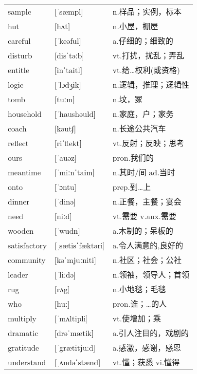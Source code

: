\documentclass[a4paper]{article}
\begin{document}
\section{}
\begin{tabular}{l l l}

sample & [ˈsæmpl] & n.样品；实例，标本 \\
hut & [hʌt] & n.小屋，棚屋 \\
careful & [ˈkeəful] & a.仔细的；细致的 \\
disturb & [disˈtəːb] & vt.打扰，扰乱；弄乱 \\
entitle & [inˈtaitl] & vt.给…权利(或资格) \\
logic & [ˈlɔdʒik] & n.逻辑，推理；逻辑性 \\
tomb & [tuːm] & n.坟，冢 \\
household & [ˈhaushəuld] & n.家庭，户；家务 \\
coach & [kəut∫] & n.长途公共汽车 \\
reflect & [riˈflekt] & vt.反射；反映；思考 \\
ours & [ˈauəz] & pron.我们的 \\
meantime & [ˈmiːnˈtaim] & n.其时/间 ad.当时 \\
onto & [ˈɔntu] & prep.到…上 \\
dinner & [ˈdinə] & n.正餐，主餐；宴会 \\
need & [niːd] & vt.需要 v.aux.需要 \\
wooden & [ˈwudn] & a.木制的；呆板的 \\
satisfactory & [ˌsætisˈfæktəri] & a.令人满意的,良好的 \\
community & [kəˈmjuːniti] & n.社区；社会；公社 \\
leader & [ˈliːdə] & n.领袖，领导人；首领 \\
rug & [rʌg] & n.小地毯；毛毯 \\
who & [huː] & pron.谁；…的人 \\
multiply & [ˈmʌltipli] & vt.使增加；乘 \\
dramatic & [drəˈmætik] & a.引人注目的，戏剧的 \\
gratitude & [ˈgrætitjuːd] & a.感激，感谢，感恩 \\
understand & [ˌʌndəˈstænd] & vt.懂；获悉 vi.懂得 \\

\end{tabular}
\end{document}
